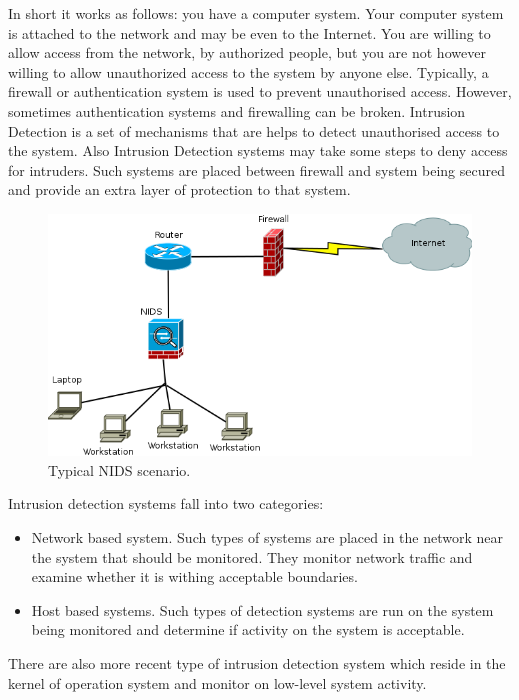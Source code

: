 \documentclass[thesis=M,english]{FITthesis}[2011/07/15]
\begin{document}
In short it works as follows: you have a computer system. Your computer system is attached to the network and may be even to the Internet. You are willing to allow access from the network, by authorized people, but you are not however willing to allow unauthorized access to the system by anyone else. Typically, a firewall or authentication system is used to prevent unauthorised access. However, sometimes authentication systems and firewalling can be broken. Intrusion Detection is a set of mechanisms that are helps to detect unauthorised access to the system. Also Intrusion Detection systems may take some steps to deny access for intruders. Such systems are placed between firewall and system being secured and provide an extra layer of protection to that system.
\begin{figure}[h]
\centering
\includegraphics[scale=0.5]{images/Typical_NIDS.png}
\caption{Typical NIDS scenario.}
\label{fig:typical_nids}
\end{figure}
Intrusion detection systems fall into two categories:
\begin{itemize}
\item Network based system. 
Such types of systems are placed in the network near the system that should be monitored. They monitor network traffic and examine whether it is withing acceptable boundaries.
\item Host based systems. 
Such types of detection systems are run on the system being monitored and determine if activity on the system is acceptable.
\end{itemize}
There are also more recent type of intrusion detection system which reside in the kernel of operation system and monitor on low-level system activity.
\end{document}
